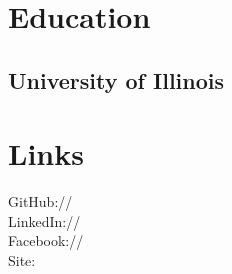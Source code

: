 \documentclass[]{deedy-resume-openfont}
\begin{document}
%
%
\lastupdated

%
%



%
%

\begin{minipage}[t]{0.33\textwidth}


\section{Education}

\subsection{University of Illinois}
\sectionsep

\vspace{8pt}

\section{Links}
GitHub:// \href{https://github.com/kylebegovich}{} \\
LinkedIn://  \href{https://www.linkedin.com/kyle-begovich}{} \\
Facebook://  \href{https://www.facebook.com/kyle.begovich.7}{} \\
Site: \href{www.kylebegovich.com}{}
\sectionsep

\vspace{8pt}


\end{minipage}
\end{document}
